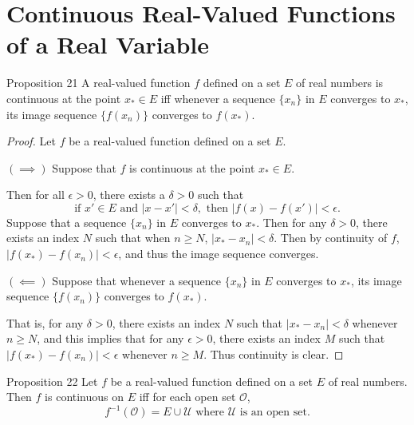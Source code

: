 \section{Continuous Real-Valued Functions of a Real Variable}
\begin{flushleft}

\begin{namedthm*}{Proposition 21}
	A real-valued function $f$ defined on a set $E$ of real numbers is continuous at the point $x_*\in E$ iff 
	whenever a sequence $\{x_n\}$ in $E$ converges to $x_*$, its image sequence $\{f(x_n)\}$ converges to $f(x_*)$.
\end{namedthm*}
\begin{proof}
	Let $f$ be a real-valued function defined on a set $E$.\par
		$(\implies)$ Suppose that $f$ is continuous at the point $x_*\in E$.\par
		Then for all $\epsilon>0$, there exists a $\delta>0$ such that 
		\[
			\text{if } x'\in E\text{ and }|x-x'|<\delta,\text{ then }|f(x)-f(x')|<\epsilon.
		\]
		Suppose that a sequence $\{x_n\}$ in $E$ converges to $x_*$. 
		Then for any $\delta>0$, there exists an index $N$ such that when $n\ge N$, $|x_*-x_n|<\delta$.
		Then by continuity of $f$, $|f(x_*)-f(x_n)|<\epsilon$, and thus the image sequence converges.\par
		$(\impliedby)$ Suppose that whenever a sequence $\{x_n\}$ in $E$ converges to $x_*$, its image sequence $\{f(x_n)\}$ converges to $f(x_*)$.\par
		That is, for any $\delta>0$, there exists an index $N$ such that $|x_*-x_n|<\delta$ whenever $n\ge N$, 
		and this implies that for any $\epsilon>0$, there exists an index $M$ such that $|f(x_*)-f(x_n)|<\epsilon$ whenever $n\ge M$.
		Thus continuity is clear.
\end{proof}

\begin{namedthm*}{Proposition 22}
	Let $f$ be a real-valued function defined on a set $E$ of real numbers.
	Then $f$ is continuous on $E$ iff for each open set $\mathcal{O}$,
	\[
	f^{-1}(\mathcal{O})=E \cup \mathcal{U}\text{ where }\mathcal{U}\text{ is an open set.}	
	\]
\end{namedthm*}


\end{flushleft}

